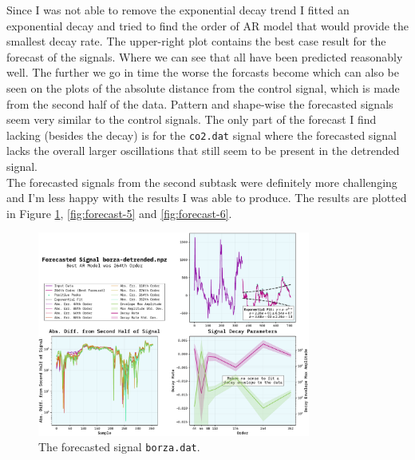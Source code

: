 \documentclass[10pt, titlepage, a4paper]{article}
\begin{document}
Since I was not able to remove the exponential decay trend I fitted an exponential decay and tried to find the order 
of AR model that would provide the smallest decay rate. The upper-right plot contains the best case result for the 
forecast of the signals. Where we can see that all have been predicted reasonably well. The further we go in time 
the worse the forcasts become which can also be seen on the plots of the absolute distance from the control signal, 
which is made from the second half of the data. Pattern and shape-wise the forecasted signals seem very similar to the 
control signals. The only part of the forecast I find lacking (besides the decay) is for the \texttt{co2.dat} signal 
where the forecasted signal lacks the overall larger oscillations that still seem to be present in the detrended signal. \\

The forecasted signals from the second subtask were definitely more challenging and I'm less happy with the results I was 
able to produce. The results are plotted in Figure \ref{fig:forecast-4}, \ref{fig:forecast-5} and \ref{fig:forecast-6}.

\begin{figure}[H]
    \centering
    \includegraphics[width=0.8\textwidth]{../LinForecast/Images/forecast-borza-detrended.npz-lin.pdf}
    \caption{The forecasted signal \texttt{borza.dat}.}
    \label{fig:forecast-4}
\end{figure}
\end{document}
